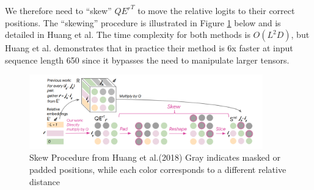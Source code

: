 \documentclass[../main.tex]{subfiles}
\begin{document}
We therefore need to “skew” $Q{E^{r}}^{T}$ to move the relative logits to their correct positions. The “skewing” procedure is illustrated in Figure \ref{fig:fig4} below and is detailed in Huang et al. \cite{Huang:1} The time complexity for both methods is $O(L^2D)$, but Huang et al. demonstrates that in practice their method is 6x faster at input sequence length 650 since it bypasses the need to manipulate larger tensors.

\begin{figure}[htpb]
    \centering
    \includegraphics[width=0.9\textwidth]{imgs/skew_procedure.png}
    \caption{Skew Procedure from Huang et al.(2018) Gray indicates masked or padded positions, while each color corresponds to a different relative distance}
    \label{fig:fig4}
\end{figure}
\end{document}
